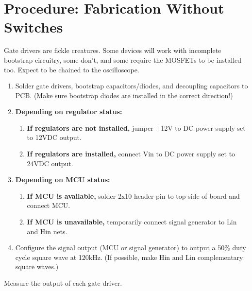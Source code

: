 \documentclass[]{report}
\begin{document}
\section{Procedure: Fabrication Without Switches}
Gate drivers are fickle creatures. Some devices will work with incomplete bootstrap circuitry, some don't, and some require the MOSFETs to be installed too. Expect to be chained to the oscilloscope.
\begin{enumerate}
	\item Solder gate drivers, bootstrap capacitors/diodes, and decoupling capacitors to PCB. (Make sure bootstrap diodes are installed in the correct direction!)
	\item \textbf{Depending on regulator status:}
	\begin{enumerate}
		\item \textbf{If regulators are not installed,} jumper +12V to DC power supply set to 12VDC output.
		\item \textbf{If regulators are installed,} connect Vin to DC power supply set to 24VDC output.
	\end{enumerate}
	\item \textbf{Depending on MCU status:}
	\begin{enumerate}
		\item \textbf{If MCU is available,} solder 2x10 header pin to top side of board and connect MCU.
		\item \textbf{If MCU is unavailable,} temporarily connect signal generator to Lin and Hin nets. 
	\end{enumerate}
	\item Configure the signal output (MCU or signal generator) to output a 50\% duty cycle square wave at 120kHz. (If possible, make Hin and Lin complementary square waves.) 
\end{enumerate}
Measure the output of each gate driver. 
\end{document}
